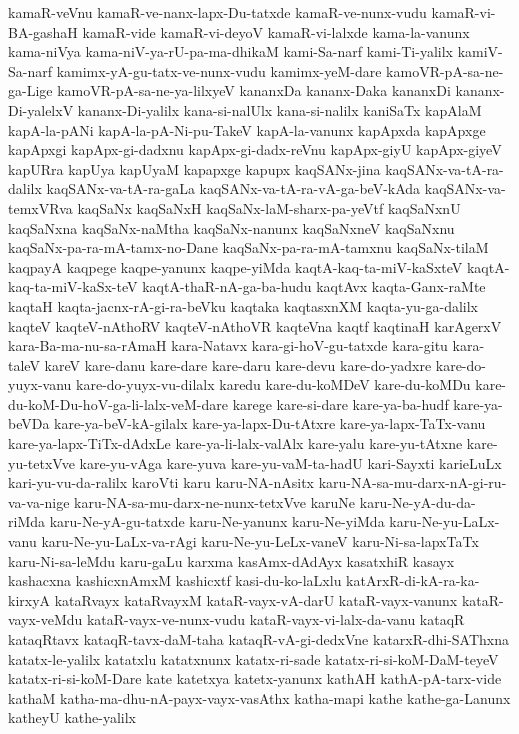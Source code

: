 {kamaR-veVnu
kamaR-ve-nanx-lapx-Du-tatxde
kamaR-ve-nunx-vudu
kamaR-vi-BA-gashaH
kamaR-vide
kamaR-vi-deyoV
kamaR-vi-lalxde
kama-la-vanunx
kama-niVya
kama-niV-ya-rU-pa-ma-dhikaM
kami-Sa-narf
kami-Ti-yalilx
kamiV-Sa-narf
kamimx-yA-gu-tatx-ve-nunx-vudu
kamimx-yeM-dare
kamoVR-pA-sa-ne-ga-Lige
kamoVR-pA-sa-ne-ya-lilxyeV
kananxDa
kananx-Daka
kananxDi
kananx-Di-yalelxV
kananx-Di-yalilx
kana-si-nalUlx
kana-si-nalilx
kaniSaTx
kapAlaM
kapA-la-pANi
kapA-la-pA-Ni-pu-TakeV
kapA-la-vanunx
kapApxda
kapApxge
kapApxgi
kapApx-gi-dadxnu
kapApx-gi-dadx-reVnu
kapApx-giyU
kapApx-giyeV
kapURra
kapUya
kapUyaM
kapapxge
kapupx
kaqSANx-jina
kaqSANx-va-tA-ra-dalilx
kaqSANx-va-tA-ra-gaLa
kaqSANx-va-tA-ra-vA-ga-beV-kAda
kaqSANx-va-temxVRva
kaqSaNx
kaqSaNxH
kaqSaNx-laM-sharx-pa-yeVtf
kaqSaNxnU
kaqSaNxna
kaqSaNx-naMtha
kaqSaNx-nanunx
kaqSaNxneV
kaqSaNxnu
kaqSaNx-pa-ra-mA-tamx-no-Dane
kaqSaNx-pa-ra-mA-tamxnu
kaqSaNx-tilaM
kaqpayA
kaqpege
kaqpe-yanunx
kaqpe-yiMda
kaqtA-kaq-ta-miV-kaSxteV
kaqtA-kaq-ta-miV-kaSx-teV‌
kaqtA-thaR-nA-ga-ba-hudu
kaqtAvx
kaqta-Ganx-raMte
kaqtaH
kaqta-jacnx-rA-gi-ra-beVku
kaqtaka
kaqtasxnXM
kaqta-yu-ga-dalilx
kaqteV
kaqteV-nAthoRV
kaqteV-nAthoVR
kaqteVna
kaqtf
kaqtinaH
karAgerxV
kara-Ba-ma-nu-sa-rAmaH
kara-Natavx
kara-gi-hoV-gu-tatxde
kara-gitu
kara-taleV
kareV
kare-danu
kare-dare
kare-daru
kare-devu
kare-do-yadxre
kare-do-yuyx-vanu
kare-do-yuyx-vu-dilalx
karedu
kare-du-koMDeV
kare-du-koMDu
kare-du-koM-Du-hoV-ga-li-lalx-veM-dare
karege
kare-si-dare
kare-ya-ba-hudf
kare-ya-beVDa
kare-ya-beV-kA-gilalx
kare-ya-lapx-Du-tAtxre
kare-ya-lapx-TaTx-vanu
kare-ya-lapx-TiTx-dAdxLe
kare-ya-li-lalx-valAlx
kare-yalu
kare-yu-tAtxne
kare-yu-tetxVve
kare-yu-vAga
kare-yuva
kare-yu-vaM-ta-hadU
kari-Sayxti
karieLuLx
kari-yu-vu-da-ralilx
karoVti
karu
karu-NA-nAsitx
karu-NA-sa-mu-darx-nA-gi-ru-va-va-nige
karu-NA-sa-mu-darx-ne-nunx-tetxVve
karuNe
karu-Ne-yA-du-da-riMda
karu-Ne-yA-gu-tatxde
karu-Ne-yanunx
karu-Ne-yiMda
karu-Ne-yu-LaLx-vanu
karu-Ne-yu-LaLx-va-rAgi
karu-Ne-yu-LeLx-vaneV
karu-Ni-sa-lapxTaTx
karu-Ni-sa-leMdu
karu-gaLu
karxma
kasAmx-dAdAyx
kasatxhiR
kasayx
kashacxna
kashicxnAmxM
kashicxtf
kasi-du-ko-laLxlu
katArxR-di-kA-ra-ka-kirxyA
kataRvayx
kataRvayxM
kataR-vayx-vA-darU
kataR-vayx-vanunx
kataR-vayx-veMdu
kataR-vayx-ve-nunx-vudu
kataR-vayx-vi-lalx-da-vanu
kataqR
kataqRtavx
kataqR-tavx-daM-taha
kataqR-vA-gi-dedxVne
katarxR-dhi-SAThxna
katatx-le-yalilx
katatxlu
katatxnunx
katatx-ri-sade
katatx-ri-si-koM-DaM-teyeV
katatx-ri-si-koM-Dare
kate
katetxya
katetx-yanunx
kathAH
kathA-pA-tarx-vide
kathaM
katha-ma-dhu-nA-payx-vayx-vasAthx
katha-mapi
kathe
kathe-ga-Lanunx
katheyU
kathe-yalilx
}
